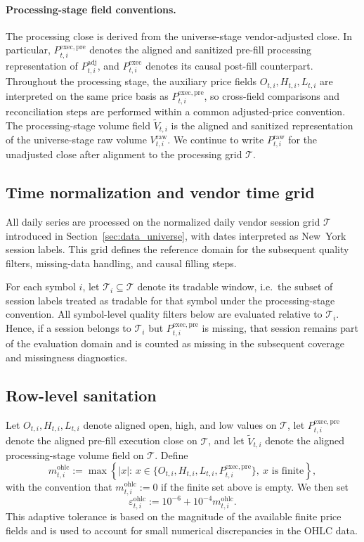 \documentclass[11pt,a4paper]{article}
\begin{document}
\paragraph{Processing-stage field conventions.}
The processing close is derived from the universe-stage vendor-adjusted close.
In particular, \(P^{\mathrm{exec,pre}}_{t,i}\) denotes the aligned and sanitized
pre-fill processing representation of \(P^{\mathrm{adj}}_{t,i}\), and
\(P^{\mathrm{exec}}_{t,i}\) denotes its causal post-fill counterpart.
Throughout the processing stage, the auxiliary price fields
\(O_{t,i}, H_{t,i}, L_{t,i}\) are interpreted on the same price basis as
\(P^{\mathrm{exec,pre}}_{t,i}\), so cross-field comparisons and reconciliation
steps are performed within a common adjusted-price convention.
The processing-stage volume field \(\widetilde V_{t,i}\) is the aligned and
sanitized representation of the universe-stage raw volume
\(V^{\mathrm{raw}}_{t,i}\).
We continue to write \(P^{\mathrm{raw}}_{t,i}\) for the unadjusted close after
alignment to the processing grid \(\mathcal T\).

\subsection{Time normalization and vendor time grid}

All daily series are processed on the normalized daily vendor session grid
\(\mathcal T\) introduced in Section~\ref{sec:data_universe}, with dates
interpreted as New~York session labels. This grid defines the reference domain
for the subsequent quality filters, missing-data handling, and causal filling
steps.

For each symbol \(i\), let \(\mathcal T_i \subseteq \mathcal T\) denote its
tradable window, i.e.\ the subset of session labels treated as tradable for
that symbol under the processing-stage convention. All symbol-level quality
filters below are evaluated relative to \(\mathcal T_i\). Hence, if a session
belongs to \(\mathcal T_i\) but \(P^{\mathrm{exec,pre}}_{t,i}\) is missing,
that session remains part of the evaluation domain and is counted as missing in
the subsequent coverage and missingness diagnostics.

\subsection{Row-level sanitation}

Let \(O_{t,i}, H_{t,i}, L_{t,i}\) denote aligned open, high, and low values on
\(\mathcal{T}\), let \(P^{\mathrm{exec,pre}}_{t,i}\) denote the aligned pre-fill
execution close on \(\mathcal{T}\), and let \(\widetilde V_{t,i}\) denote the
aligned processing-stage volume field on \(\mathcal{T}\). Define
\[
m_{t,i}^{\mathrm{ohlc}}
:=
\max\!\left\{
|x|:\,
x\in\{O_{t,i},H_{t,i},L_{t,i},P^{\mathrm{exec,pre}}_{t,i}\},
\ x\text{ is finite}
\right\},
\]
with the convention that \(m_{t,i}^{\mathrm{ohlc}}:=0\) if the finite set above
is empty. We then set
\[
\varepsilon_{t,i}^{\mathrm{ohlc}}
:=
10^{-6}
+10^{-4} m_{t,i}^{\mathrm{ohlc}}.
\]
This adaptive tolerance is based on the magnitude of the available finite price
fields and is used to account for small numerical discrepancies in the OHLC
data.
\end{document}

